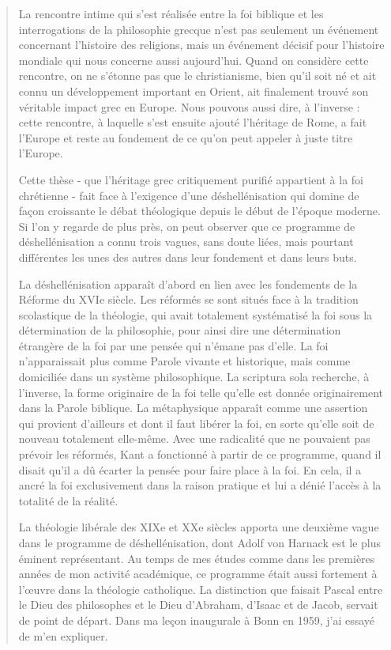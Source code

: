 \begin{quote}
La rencontre intime qui s'est réalisée entre la foi biblique et les interrogations de la philosophie grecque n'est pas seulement un événement concernant l'histoire des religions, mais un événement décisif pour l'histoire mondiale qui nous concerne aussi aujourd'hui. Quand on considère cette rencontre, on ne s'étonne pas que le christianisme, bien qu'il soit né et ait connu un développement important en Orient, ait finalement trouvé son véritable impact grec en Europe. Nous pouvons aussi dire, à l'inverse : cette rencontre, à laquelle s'est ensuite ajouté l'héritage de Rome, a fait l'Europe et reste au fondement de ce qu'on peut appeler à juste titre l'Europe.

Cette thèse - que l'héritage grec critiquement purifié appartient à la foi chrétienne - fait face à l'exigence d'une déshellénisation qui domine de façon croissante le débat théologique depuis le début de l'époque moderne. Si l'on y regarde de plus près, on peut observer que ce programme de déshellénisation a connu trois vagues, sans doute liées, mais pourtant différentes les unes des autres dans leur fondement et dans leurs buts.

La déshellénisation apparaît d'abord en lien avec les fondements de la Réforme du XVIe siècle. Les réformés se sont situés face à la tradition scolastique de la théologie, qui avait totalement systématisé la foi sous la détermination de la philosophie, pour ainsi dire une détermination étrangère de la foi par une pensée qui n'émane pas d'elle. La foi n'apparaissait plus comme Parole vivante et historique, mais comme domiciliée dans un système philosophique. La scriptura sola recherche, à l'inverse, la forme originaire de la foi telle qu'elle est donnée originairement dans la Parole biblique. La métaphysique apparaît comme une assertion qui provient d'ailleurs et dont il faut libérer la foi, en sorte qu'elle soit de nouveau totalement elle-même. Avec une radicalité que ne pouvaient pas prévoir les réformés, Kant a fonctionné à partir de ce programme, quand il disait qu'il a dû écarter la pensée pour faire place à la foi. En cela, il a ancré la foi exclusivement dans la raison pratique et lui a dénié l'accès à la totalité de la réalité.

La théologie libérale des XIXe et XXe siècles apporta une deuxième vague dans le programme de déshellénisation, dont Adolf von Harnack est le plus éminent représentant. Au temps de mes études comme dans les premières années de mon activité académique, ce programme était aussi fortement à l'œuvre dans la théologie catholique. La distinction que faisait Pascal entre le Dieu des philosophes et le Dieu d'Abraham, d'Isaac et de Jacob, servait de point de départ. Dans ma leçon inaugurale à Bonn en 1959, j'ai essayé de m'en expliquer.


\end{quote}
